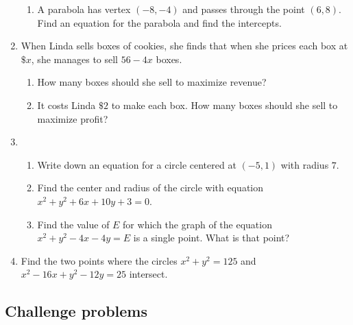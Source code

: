 \begin{enumerate}
\begin{enumerate}
\item A parabola has vertex $(-8,-4)$ and passes through the point $(6,8)$. Find an equation for the parabola and find the intercepts.
\end{enumerate}
\item When Linda sells boxes of cookies, she finds that when she prices each box at $\$x$, she manages to sell $56 - 4x$ boxes.
\begin{enumerate}
\item How many boxes should she sell to maximize revenue?
\item It costs Linda $\$2$ to make each box. How many boxes should she sell to maximize profit?
\end{enumerate}
\item \begin{enumerate}
\item Write down an equation for a circle centered at $(-5, 1)$ with radius $7$.
\item Find the center and radius of the circle with equation $x^2 + y^2 + 6x + 10y + 3 = 0$.
\item Find the value of $E$ for which the graph of the equation $x^2 + y^2 - 4x - 4y = E$ is a single point. What is that point?
\end{enumerate}
\item Find the two points where the circles $x^2 + y^2 = 125$ and $x^2 - 16x + y^2 - 12y = 25$ intersect.
\end{enumerate}


\subsection{Challenge problems}

